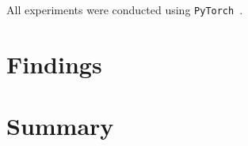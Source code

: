 \documentclass[10pt,conference,compsocconf]{IEEEtran}
\begin{document}
All experiments were conducted using \texttt{PyTorch}~\cite{torch}. 

\section{Findings}

\section{Summary}




\end{document}
